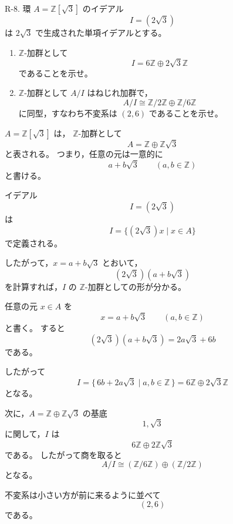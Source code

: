 
\begin{exercise}
	R-8. 環 $A=\mathbb{Z}[\sqrt{3}]$ のイデアル
	\[
	I=(2\sqrt{3})
	\]
	は $2\sqrt{3}$ で生成された単項イデアルとする。
	\begin{enumerate}
		\item $\mathbb{Z}$-加群として
		\[
		I=6\mathbb{Z}\oplus 2\sqrt{3}\mathbb{Z}
		\]
		であることを示せ。
		\item $\mathbb{Z}$-加群として $A/I$ はねじれ加群で，
		\[
		A/I\cong \mathbb{Z}/2\mathbb{Z}\oplus \mathbb{Z}/6\mathbb{Z}
		\]
		に同型，すなわち不変系は $(2,6)$ であることを示せ。
	\end{enumerate}
\end{exercise}

\begin{background}
	$A=\mathbb{Z}[\sqrt{3}]$ は，
	$\mathbb{Z}$-加群として
	\[
	A=\mathbb{Z}\oplus \mathbb{Z}\sqrt{3}
	\]
	と表される。
	つまり，任意の元は一意的に
	\[
	a+b\sqrt{3}
	\qquad
	(a,b\in\mathbb{Z})
	\]
	と書ける。
	
	イデアル
	\[
	I=(2\sqrt{3})
	\]
	は
	\[
	I=\{(2\sqrt{3})x\mid x\in A\}
	\]
	で定義される。
	
	したがって，$x=a+b\sqrt{3}$ とおいて，
	\[
	(2\sqrt{3})(a+b\sqrt{3})
	\]
	を計算すれば，$I$ の $\mathbb{Z}$-加群としての形が分かる。
\end{background}

\begin{strategy}
	任意の元 $x\in A$ を
	\[
	x=a+b\sqrt{3}
	\qquad
	(a,b\in\mathbb{Z})
	\]
	と書く。
	すると
	\[
	(2\sqrt{3})(a+b\sqrt{3})
	=
	2a\sqrt{3}+6b
	\]
	である。
	
	したがって
	\[
	I
	=
	\{\,6b+2a\sqrt{3}\mid a,b\in\mathbb{Z}\,\}
	=
	6\mathbb{Z}\oplus 2\sqrt{3}\mathbb{Z}
	\]
	となる。
	
	次に，$A=\mathbb{Z}\oplus\mathbb{Z}\sqrt{3}$ の基底
	\[
	1,\sqrt{3}
	\]
	に関して，$I$ は
	\[
	6\mathbb{Z}\oplus 2\mathbb{Z}\sqrt{3}
	\]
	である。
	したがって商を取ると
	\[
	A/I
	\cong
	(\mathbb{Z}/6\mathbb{Z})
	\oplus
	(\mathbb{Z}/2\mathbb{Z})
	\]
	となる。
	
	不変系は小さい方が前に来るように並べて
	\[
	(2,6)
	\]
	である。
\end{strategy}